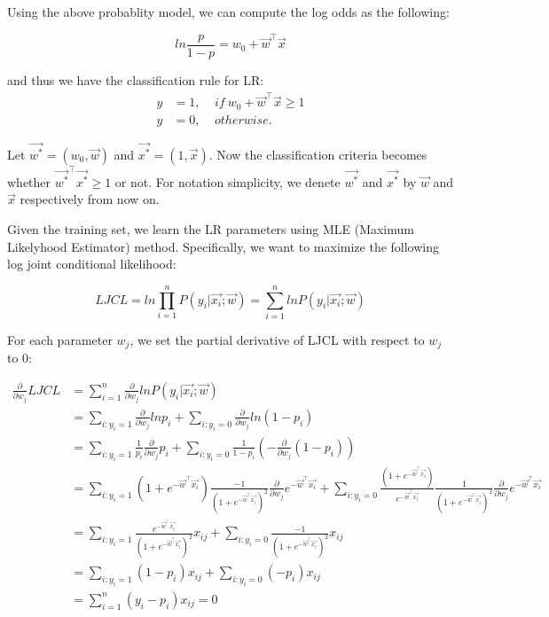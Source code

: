 \documentclass{article} %
\begin{document}
Using the above probablity model, we can compute the log odds as the following:

\begin{equation}
  ln\frac{p}{1-p} = w_0 + \vec{w}^\top\vec{x}
\end{equation}

and thus we have the classification rule for LR:
\begin{align*}
  y &= 1, \ \ \ \ \ if \ w_0 + \vec{w}^\top\vec{x} \geq 1\\
  y &= 0, \ \ \ \ \ otherwise.
\end{align*}

Let $\vec{w^*} = (w_0, \vec{w})$ and $\vec{x^*} = (1, \vec{x})$. Now the classification criteria becomes whether $\vec{w^*}^\top\vec{x^*} \geq 1$ or not. For notation simplicity, we denete $\vec{w^*}$ and $\vec{x^*}$ by $\vec{w}$ and $\vec{x}$ respectively from now on.

Given the training set, we learn the LR parameters using MLE (Maximum Likelyhood Estimator) method. Specifically, we want to maximize the following log joint conditional likelihood:

\begin{equation}
  LJCL = ln\prod\limits_{i=1}^nP(y_i | \vec{x_i}; \vec{w}) = \sum\limits_{i=1}^nlnP(y_i | \vec{x_i}; \vec{w})
\end{equation}

For each parameter $w_j$, we set the partial derivative of LJCL with respect to $w_j$ to 0:

\begin{equation}
\begin{split}
  \frac{\partial}{\partial w_j} LJCL &= \sum\limits_{i=1}^n\frac{\partial}{\partial w_j}lnP(y_i | \vec{x_i}; \vec{w})\\
  &= \sum\limits_{i:y_i=1}\frac{\partial}{\partial w_j}lnp_i + \sum\limits_{i:y_i=0}\frac{\partial}{\partial w_j}ln(1-p_i)\\
  &= \sum\limits_{i:y_i=1}\frac{1}{p_i}\frac{\partial}{\partial w_j}p_i + \sum\limits_{i:y_i=0}\frac{1}{1-p_i}(-\frac{\partial}{\partial w_j}(1-p_i))\\
  &= \sum\limits_{i:y_i=1}(1+e^{-\vec{w}^\top\vec{x_i}})\frac{-1}{(1+e^{-\vec{w}^\top\vec{x_i}})^2}\frac{\partial}{\partial w_j}e^{-\vec{w}^\top\vec{x_i}} + \sum\limits_{i:y_i=0}\frac{(1+e^{-\vec{w}^\top\vec{x_i}})}{e^{-\vec{w}^\top\vec{x_i}}}\frac{1}{(1+e^{-\vec{w}^\top\vec{x_i}})^2}\frac{\partial}{\partial w_j}e^{-\vec{w}^\top\vec{x_i}}\\
  &= \sum\limits_{i:y_i=1}\frac{e^{-\vec{w}^\top\vec{x_i}}}{(1+e^{-\vec{w}^\top\vec{x_i}})^2}x_{ij} + \sum\limits_{i:y_i=0}\frac{-1}{(1+e^{-\vec{w}^\top\vec{x_i}})^2}x_{ij}\\
  &= \sum\limits_{i:y_i=1}(1-p_i)x_{ij} + \sum\limits_{i:y_i=0}(-p_i)x_{ij}\\
  &= \sum\limits_{i=1}^n(y_i-p_i)x_{ij} = 0
\end{split}
\end{equation}
\end{document}
